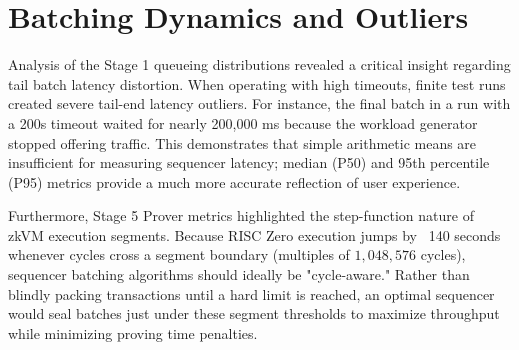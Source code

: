 \section{Batching Dynamics and Outliers}
\label{sec:batching_discussion}
Analysis of the Stage 1 queueing distributions revealed a critical insight regarding tail batch latency distortion. When operating with high timeouts, finite test runs created severe tail-end latency outliers. For instance, the final batch in a run with a 200s timeout waited for nearly 200,000 ms because the workload generator stopped offering traffic. This demonstrates that simple arithmetic means are insufficient for measuring sequencer latency; median (P50) and 95th percentile (P95) metrics provide a much more accurate reflection of user experience.

Furthermore, Stage 5 Prover metrics highlighted the step-function nature of zkVM execution segments. Because RISC Zero execution jumps by ~140 seconds whenever cycles cross a segment boundary (multiples of $1,048,576$ cycles), sequencer batching algorithms should ideally be "cycle-aware." Rather than blindly packing transactions until a hard limit is reached, an optimal sequencer would seal batches just under these segment thresholds to maximize throughput while minimizing proving time penalties.
